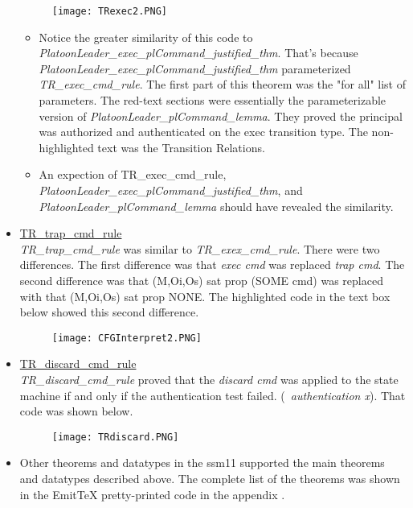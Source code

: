 \begin{itemize}
\begin{figure}[h!]
  \centering
  \texttt{[image: TRexec2.PNG]}
\end{figure}
\begin{itemize}
\item Notice the greater similarity of this code to \textit{PlatoonLeader_exec_plCommand_justified_thm}.
  That's because \textit{PlatoonLeader_exec_plCommand_justified_thm} parameterized \textit{TR_exec_cmd_rule}.
  The first part of this theorem was the "for all" list of parameters.  The red-text sections were essentially
  the parameterizable version of \textit{PlatoonLeader_plCommand_lemma}.  They proved the principal was
  authorized and authenticated on the exec transition type.  The non-highlighted text was the Transition Relations.
\item An expection of TR_exec_cmd_rule, \textit{PlatoonLeader_exec_plCommand_justified_thm},
  and \textit{PlatoonLeader_plCommand_lemma} should have revealed the similarity.
  \end{itemize}
\item \underline{TR_trap_cmd_rule}\\
  \textit{TR_trap_cmd_rule} was similar to \textit{TR_exex_cmd_rule}.  There were two differences.
  The first difference was that \textit{exec cmd} was replaced \textit{trap cmd}.  The second difference
  was that (M,Oi,Os) sat prop (SOME cmd) was replaced with that (M,Oi,Os) sat prop  NONE.  The
  highlighted code in the text box below showed this second difference.
  \begin{figure}[h]
  \centering
  \texttt{[image: CFGInterpret2.PNG]}
\end{figure}
\item \underline{TR_discard_cmd_rule}\\
  \textit{TR_discard_cmd_rule} proved that the \textit{discard cmd} was applied to the state machine
  if and only if the authentication test failed.  (\textit{~authentication x}).  That code was shown below.
  \begin{figure}[h]
  \centering
  \texttt{[image: TRdiscard.PNG]}
\end{figure}
\item Other theorems and datatypes in the ssm11 supported the main theorems and datatypes described above.
  The complete list of the theorems was shown in the EmitTeX pretty-printed code in the appendix .\\
\end{itemize}


